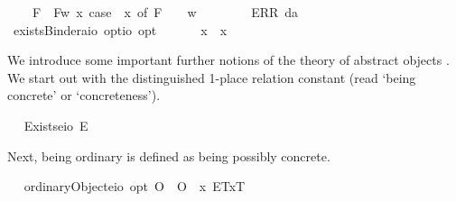 \begin{isabellebody}
\ \ \ \ F{\isacharparenleft}{\isacharunderscore}{\isacharparenright}\ {\isasymRightarrow}\ F{\isacharparenleft}{\isasymlambda}w{\isachardot}\ {\isasymexists}x{\isachardot}\ case\ {\isacharparenleft}{\isasymPhi}\ x{\isacharparenright}\ of\ F\ {\isasympsi}\ {\isasymRightarrow}\ {\isasympsi}\ w{\isacharparenright}\ {\isacharbar}\ \isanewline
\ \ \ \ {\isacharunderscore}\ {\isasymRightarrow}\ ERR\ da{\isachardoublequoteclose}\ \isanewline
\ \isamarkupfalse%
\ existsBinder{\isacharcolon}{\isacharcolon}{\isachardoublequoteopen}{\isacharparenleft}{\isacharprime}a{\isasymRightarrow}io\ opt{\isacharparenright}{\isasymRightarrow}io\ opt{\isachardoublequoteclose}\ {\isacharparenleft}\ {\isachardoublequoteopen}\isactrlbold {\isasymexists}{\isachardoublequoteclose}\ {\isacharbrackleft}{}{\isacharbrackright}\ {}{\isacharparenright}\ \ \ {\isachardoublequoteopen}\isactrlbold {\isasymexists}x{\isachardot}\ {\isasymphi}\ x\ {\isasymequiv}\ \isactrlbold {\isasymexists}{\isasymphi}{\isachardoublequoteclose}%
\isamarkuptrue%
%
\begin{isamarkuptext}%
We introduce some important further notions of the theory of abstract objects \cite{zalta83:_abstr_objec}. We 
  start out with the distinguished 1-place relation constant  (read ‘being concrete’ or ‘concreteness’).%
\end{isamarkuptext}\isamarkuptrue%
\ \isamarkupfalse%
\ Exists{\isacharcolon}{\isacharcolon}{\isachardoublequoteopen}{\isacharparenleft}e{\isasymRightarrow}io{\isacharparenright}{\isachardoublequoteclose}\ {\isacharparenleft}{\isachardoublequoteopen}E{\isacharbang}{\isachardoublequoteclose}{\isacharparenright}%
\begin{isamarkuptext}%
Next, being ordinary is defined as being possibly concrete.%
\end{isamarkuptext}\isamarkuptrue%
\ \isamarkupfalse%
\ ordinaryObject{\isacharcolon}{\isacharcolon}{\isachardoublequoteopen}{\isacharparenleft}e{\isasymRightarrow}io{\isacharparenright}\ opt{\isachardoublequoteclose}\ {\isacharparenleft}{\isachardoublequoteopen}O{\isacharbang}{\isachardoublequoteclose}{\isacharparenright}\ \ {\isachardoublequoteopen}O{\isacharbang}\ {\isasymequiv}\ \isactrlbold {\isasymlambda}x{\isachardot}\ \isactrlbold {\isasymdiamond}{\isasymlparr}E{\isacharbang}\isactrlsup T{\isacharcomma}x\isactrlsup T{\isasymrparr}{\isachardoublequoteclose}%

\end{isabellebody}

